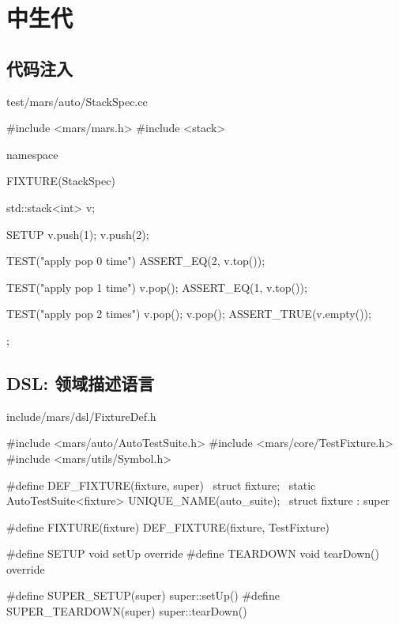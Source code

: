 \section{中生代}

\begin{content}

\subsection{代码注入}

\begin{nodiff}{test/mars/auto/StackSpec.cc}
 \begin{c++}
#include <mars/mars.h>
#include <stack>

namespace {
  FIXTURE(StackSpec) {
    std::stack<int> v;

    SETUP {
      v.push(1);
      v.push(2);
    }

    TEST("apply pop 0 time") {
      ASSERT_EQ(2, v.top());
    }

    TEST("apply pop 1 time") {
      v.pop();
      ASSERT_EQ(1, v.top());
    }

    TEST("apply pop 2 times") {
      v.pop();
      v.pop();
      ASSERT_TRUE(v.empty());
    }
  };
}
 \end{c++}
\end{nodiff}

\subsection{DSL: 领域描述语言}

\begin{nodiff}{include/mars/dsl/FixtureDef.h}
 \begin{c++}
#include <mars/auto/AutoTestSuite.h>
#include <mars/core/TestFixture.h>
#include <mars/utils/Symbol.h>

#define DEF_FIXTURE(fixture, super)                          \
struct fixture;                                              \
static AutoTestSuite<fixture> UNIQUE_NAME(auto_suite);  \
struct fixture : super

#define FIXTURE(fixture)  DEF_FIXTURE(fixture, TestFixture)

#define SETUP    void setUp override
#define TEARDOWN void tearDown() override

#define SUPER_SETUP(super)    super::setUp()
#define SUPER_TEARDOWN(super) super::tearDown()
 \end{c++}
\end{nodiff}


\end{content}
